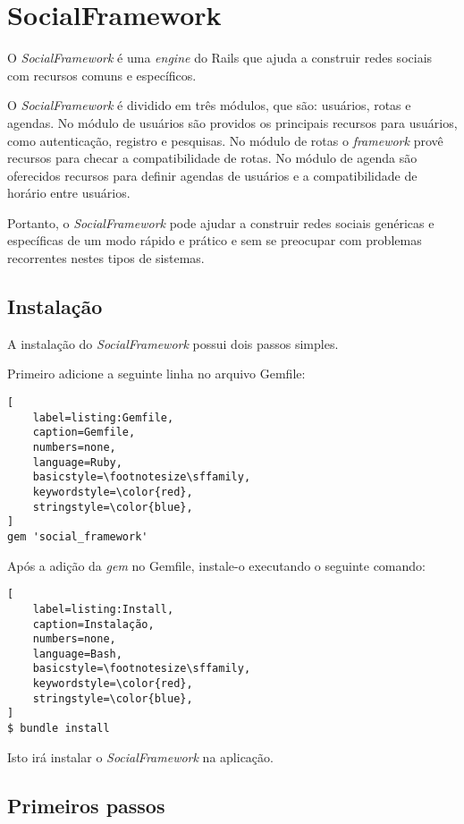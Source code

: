 \chapter{SocialFramework}
\label{chapter:SocialFramework}

O \textit{SocialFramework} é uma \textit{engine} do Rails que ajuda a construir redes sociais com recursos comuns e específicos.

O \textit{SocialFramework} é dividido em três módulos, que são: usuários, rotas e agendas. No módulo de usuários são providos os principais recursos para usuários, como autenticação, registro e pesquisas. No módulo de rotas o \textit{framework} provê recursos para checar a compatibilidade de rotas. No módulo de agenda são oferecidos recursos para definir agendas de usuários e a compatibilidade de horário entre usuários.

Portanto, o \textit{SocialFramework} pode ajudar a construir redes sociais genéricas e específicas de um modo rápido e prático e sem se preocupar com problemas recorrentes nestes tipos de sistemas.

\section{Instalação}

A instalação do \textit{SocialFramework} possui dois passos simples.

Primeiro adicione a seguinte linha no arquivo Gemfile:

\begin{lstlisting}[
    label=listing:Gemfile,
    caption=Gemfile,
    numbers=none,
    language=Ruby,
    basicstyle=\footnotesize\sffamily,
    keywordstyle=\color{red},
    stringstyle=\color{blue},
]
gem 'social_framework'
\end{lstlisting}

Após a adição da \textit{gem} no Gemfile, instale-o executando o seguinte comando:

\begin{lstlisting}[
    label=listing:Install,
    caption=Instalação,
    numbers=none,
    language=Bash,
    basicstyle=\footnotesize\sffamily,
    keywordstyle=\color{red},
    stringstyle=\color{blue},
]
$ bundle install
\end{lstlisting}

Isto irá instalar o \textit{SocialFramework} na aplicação.

\section{Primeiros passos}

